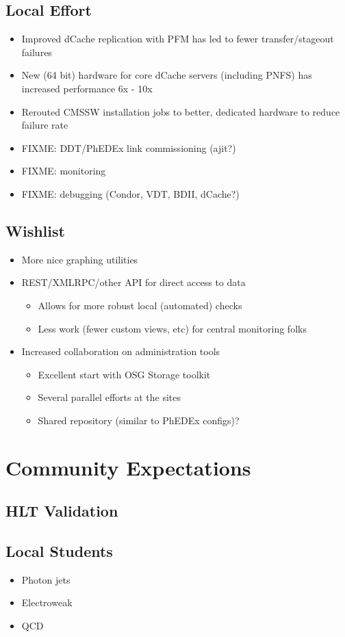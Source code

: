 \documentclass{beamer}
\begin{document}
\subsection{Local Effort}
\begin{frame}
\begin{itemize}
    \item Improved dCache replication with PFM has led to fewer transfer/stageout failures
    \item New (64 bit) hardware for core dCache servers (including PNFS) has increased performance 6x - 10x
    \item Rerouted CMSSW installation jobs to better, dedicated hardware to reduce failure rate
    \item FIXME: DDT/PhEDEx link commissioning (ajit?)
    \item FIXME: monitoring
    \item FIXME: debugging (Condor, VDT, BDII, dCache?)
\end{itemize}
\end{frame}

\subsection{Wishlist}
\begin{frame}
\begin{itemize}
    \item More nice graphing utilities
    \item REST/XMLRPC/other API for direct access to data
    \begin{itemize}
        \item Allows for more robust local (automated) checks
        \item Less work (fewer custom views, etc) for central monitoring folks
    \end{itemize}
    \item Increased collaboration on administration tools
    \begin{itemize}
        \item Excellent start with OSG Storage toolkit
        \item Several parallel efforts at the sites
        \item Shared repository (similar to PhEDEx configs)?
    \end{itemize}
\end{itemize}
\end{frame}

\section{Community Expectations}
\subsection{HLT Validation}
\begin{frame}
\end{frame}

\subsection{Local Students}
\begin{frame}
\begin{itemize}
    \item Photon jets
    \item Electroweak
    \item QCD
\end{itemize}
\end{frame}
\end{document}
